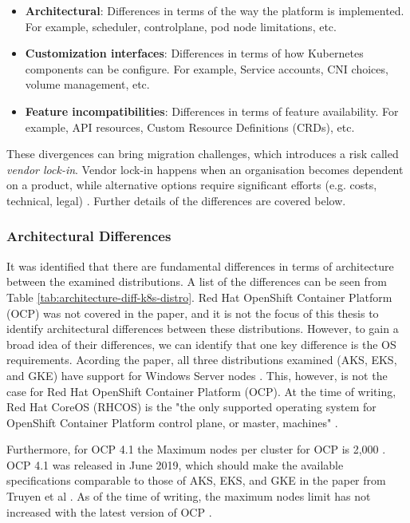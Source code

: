 \begin{itemize}

\item \textbf{Architectural}: Differences in terms of the way the platform is implemented. For example, scheduler, controlplane, pod node limitations, etc. 
\item \textbf{Customization interfaces}: Differences in terms of how Kubernetes components can be configure. For example, Service accounts, CNI choices, volume management, etc.
\item \textbf{Feature incompatibilities}: Differences in terms of feature availability. For example, API resources, Custom Resource Definitions (CRDs), etc.

\end{itemize}

These divergences can bring migration challenges, which introduces a risk called \textit{vendor lock-in}. Vendor lock-in happens when an organisation becomes dependent on a product, while alternative options require significant efforts (e.g. costs, technical, legal) \cite{opara2016critical}. Further details of the differences are covered below.


\subsubsection{Architectural Differences}

It was identified that there are fundamental differences in terms of architecture between the examined distributions. A list of the differences can be seen from Table \ref{tab:architecture-diff-k8s-distro}. Red Hat OpenShift Container Platform (OCP) was not covered in the paper, and it is not the focus of this thesis to identify architectural differences between these distributions. However, to gain a broad idea of their differences, we can identify that one key difference is the OS requirements. Acording the paper, all three distributions examined (AKS, EKS, and GKE) have support for Windows Server nodes \cite{truyenManagingFeatureCompatibility2020}. This, however, is not the case for Red Hat OpenShift Container Platform (OCP). At the time of writing, Red Hat CoreOS (RHCOS) is the "the only supported operating system for OpenShift Container Platform control plane, or master, machines" \cite{RedHatEnterprise}.

Furthermore, for OCP 4.1 the Maximum nodes per cluster for OCP is 2,000 \cite{Chapter6Planning}. OCP 4.1 was released in June 2019, which should make the available specifications comparable to those of AKS, EKS, and GKE in the paper from Truyen et al \cite{truyenManagingFeatureCompatibility2020}. As of the time of writing, the maximum nodes limit has not increased with the latest version of OCP \cite{Chapter4Planning}.


